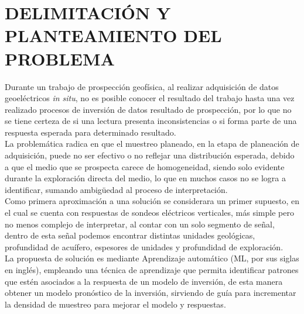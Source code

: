 \chapter{DELIMITACIÓN Y PLANTEAMIENTO DEL PROBLEMA}

Durante un trabajo de prospección geofísica, al realizar adquisición de datos geoeléctricos \textit{in situ}, no es posible conocer el resultado del trabajo hasta una vez realizado procesos de inversión de datos resultado de prospección, por lo que no se tiene certeza de si una lectura presenta inconsistencias o si forma parte de una respuesta esperada para determinado resultado.\\

La problemática radica en que el muestreo planeado, en la etapa de planeación de adquisición, puede no ser efectivo o no reflejar una distribución esperada, debido a que el medio que se prospecta carece de homogeneidad, siendo solo evidente durante la exploración directa del medio, lo que en muchos casos no se logra a identificar, sumando ambigüedad al proceso de interpretación.\\ 

Como primera aproximación a una solución se considerara un primer supuesto, en el cual se cuenta con respuestas de sondeos eléctricos verticales, más simple pero no menos complejo de interpretar, al contar con un solo segmento de señal, dentro de esta señal podemos encontrar distintas unidades geológicas, profundidad de acuífero, espesores de unidades y profundidad de exploración.\\

La propuesta de solución es mediante Aprendizaje automático (ML, por sus siglas en inglés), empleando una técnica de aprendizaje que permita identificar patrones que estén asociados a la respuesta de un modelo de inversión, de esta manera obtener un modelo pronóstico de la inversión, sirviendo de guía para incrementar la densidad de muestreo para mejorar el modelo y respuestas.
